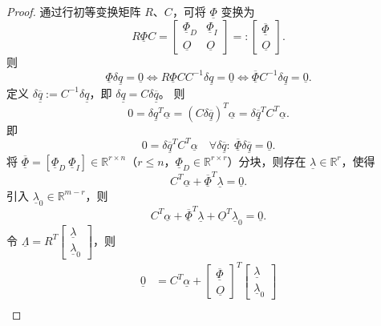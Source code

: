 \begin{proof}
通过行初等变换矩阵 \( R \)、\( C \)，可将 \( \underline{\Phi} \) 变换为
\[
R \underline{\Phi} C = \begin{bmatrix}
\underline{\Phi}_D & \underline{\Phi}_I \\
\underline{O} & \underline{O}
\end{bmatrix} =: \begin{bmatrix}
\overline{\underline{\Phi}} \\
\underline{O}
\end{bmatrix}.
\]
则
\[
\underline{\Phi} \delta \underline{q} = \underline{0} \iff R \underline{\Phi} C C^{-1} \delta \underline{q} = \underline{0} \iff \overline{\underline{\Phi}} C^{-1} \delta \underline{q} = \underline{0}.
\]
定义 \( \delta \overline{\underline{q}} := C^{-1} \delta \underline{q} \)，即 \( \delta \underline{q} = C \delta \overline{\underline{q}} \)。
则
\[
0 = \delta \underline{q}^T \underline{\alpha} = (C \delta \overline{\underline{q}})^T \underline{\alpha} = \delta \overline{\underline{q}}^T C^T \underline{\alpha}.
\]
即
\[
0 = \delta \overline{\underline{q}}^T C^T \underline{\alpha} \quad \forall \delta \overline{\underline{q}}: \ \overline{\underline{\Phi}} \delta \overline{\underline{q}} = \underline{0}.
\]
将 \( \overline{\underline{\Phi}} = [\underline{\Phi}_D \ \underline{\Phi}_I] \in \mathbb{R}^{r \times n} \)（\( r \leq n \)，\( \underline{\Phi}_D \in \mathbb{R}^{r \times r} \)）分块，则存在 \( \underline{\lambda} \in \mathbb{R}^r \)，使得
\[
C^T \underline{\alpha} + \overline{\underline{\Phi}}^T \underline{\lambda} = \underline{0}.
\]
引入 \( \underline{\lambda}_0 \in \mathbb{R}^{m-r} \)，则
\[
C^T \underline{\alpha} + \overline{\underline{\Phi}}^T \underline{\lambda} + \underline{O}^T \underline{\lambda}_0 = \underline{0}.
\]
令 \( \underline{\Lambda} = R^T \begin{bmatrix}
\underline{\lambda} \\
\underline{\lambda}_0
\end{bmatrix} \)，则
\[
\begin{aligned}
\underline{0} &= C^T \underline{\alpha} + \begin{bmatrix}
\overline{\underline{\Phi}} \\
\underline{O}
\end{bmatrix}^T \begin{bmatrix}
\underline{\lambda} \\
\underline{\lambda}_0
\end{bmatrix} \\

\end{aligned}\]
\end{proof}
